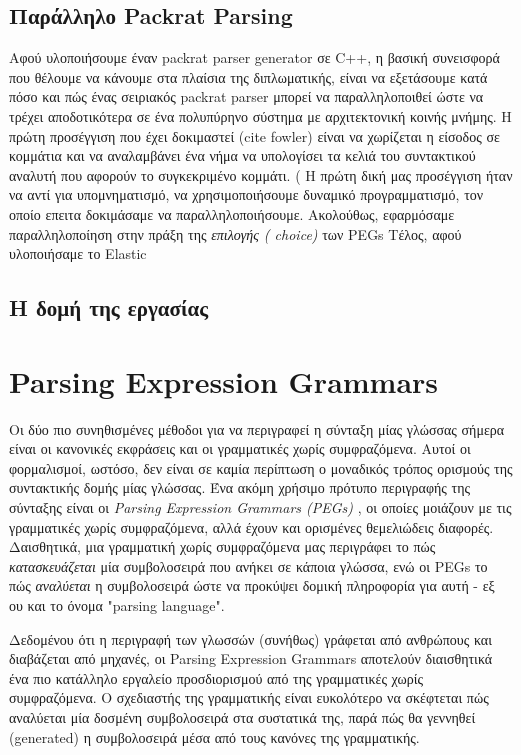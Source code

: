 \documentclass[diploma]{softlab-thesis}
\begin{document}
\section{  Παράλληλο Packrat Parsing}
Αφού  υλοποιήσουμε έναν  packrat parser generator σε C++, η βασική συνεισφορά που θέλουμε να κάνουμε στα πλαίσια της διπλωματικής, είναι να εξετάσουμε κατά πόσο και πώς ένας σειριακός packrat parser μπορεί να παραλληλοποιθεί ώστε να τρέχει αποδοτικότερα σε ένα πολυπύρηνο σύστημα με αρχιτεκτονική κοινής μνήμης.
Η πρώτη προσέγγιση που έχει δοκιμαστεί (cite fowler) είναι να χωρίζεται η είσοδος σε κομμάτια και να αναλαμβάνει ένα νήμα να υπολογίσει τα κελιά του συντακτικού αναλυτή που αφορούν το συγκεκριμένο κομμάτι. (%
H  πρώτη δική μας προσέγγιση ήταν να αντί για υπομνηματισμό, να χρησιμοποιήσουμε δυναμικό προγραμματισμό, τον οποίο επειτα δοκιμάσαμε να παραλληλοποιήσουμε.
Ακολούθως, εφαρμόσαμε παραλληλοποίηση στην πράξη της \textit{ επιλογής ( choice)} των  PEGs %
Τέλος, αφού υλοποιήσαμε το  Elastic %

\section{  Η δομή της εργασίας}

\chapter{ Parsing Expression Grammars }

Οι δύο πιο συνηθισμένες μέθοδοι για να περιγραφεί η σύνταξη μίας γλώσσας σήμερα είναι οι κανονικές εκφράσεις και οι γραμματικές χωρίς συμφραζόμενα. 
Αυτοί οι φορμαλισμοί, ωστόσο, δεν είναι σε καμία περίπτωση ο μοναδικός τρόπος ορισμούς της συντακτικής δομής μίας γλώσσας. 
Ένα ακόμη χρήσιμο πρότυπο περιγραφής της σύνταξης είναι οι  \textit{Parsing Expression Grammars (PEGs)} \cite{Ford2004}, οι οποίες μοιάζουν με τις γραμματικές χωρίς συμφραζόμενα, αλλά έχουν και ορισμένες θεμελιώδεις διαφορές. 
Δαισθητικά, μια γραμματική χωρίς συμφραζόμενα μας περιγράφει το πώς  \textit{κατασκευάζεται} μία συμβολοσειρά που ανήκει σε κάποια γλώσσα, ενώ οι  PEGs  το πώς  \textit{αναλύεται} η συμβολοσειρά ώστε να προκύψει δομική πληροφορία για αυτή - εξ ου και το όνομα  "parsing language". 

Δεδομένου ότι η περιγραφή των γλωσσών (συνήθως) γράφεται από ανθρώπους και διαβάζεται από μηχανές, οι  Parsing Expression Grammars αποτελούν διαισθητικά ένα πιο κατάλληλο εργαλείο προσδιορισμού 
από της γραμματικές χωρίς συμφραζόμενα. 
Ο σχεδιαστής της γραμματικής είναι ευκολότερο να σκέφτεται πώς αναλύεται μία δοσμένη συμβολοσειρά στα συστατικά της, παρά πώς θα γεννηθεί (generated) η συμβολοσειρά μέσα από τους κανόνες της γραμματικής.
\end{document}
